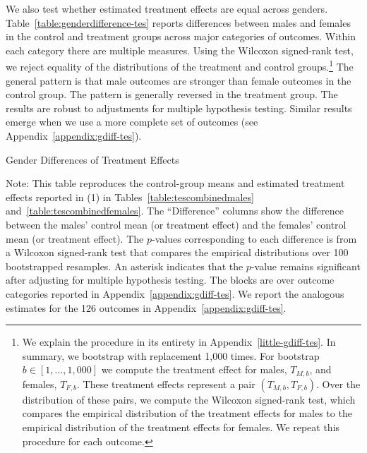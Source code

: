 We also test whether estimated treatment effects are equal across genders. Table~\ref{table:genderdifference-tes} reports differences between males and females in the control and treatment groups across major categories of outcomes. Within each category there are multiple measures. Using the Wilcoxon signed-rank test, we reject equality of the distributions of the treatment and control groups.\footnote{We explain the procedure in its entirety in Appendix~\ref{little-gdiff-tes}. In summary, we bootstrap with replacement 1,000 times. For bootstrap $b \in [1, \ldots, 1,000]$ we compute the treatment effect for males, $T_{M,b}$, and females, $T_{F,b}$. These treatment effects represent a pair $(T_{M,b}, T_{F,b})$. Over the distribution of these pairs, we compute the Wilcoxon signed-rank test, which compares the empirical distribution of the treatment effects for males to the empirical distribution of the treatment effects for females. We repeat this procedure for each outcome.} The general pattern is that male outcomes are stronger than female outcomes in the control group. The pattern is generally reversed in the treatment group. The results are robust to adjustments for multiple hypothesis testing. Similar results emerge when we use a more complete set of outcomes (see Appendix~\ref{appendix:gdiff-tes}).

\begin{table}
\centering
\begin{threeparttable}
\caption{Gender Differences of Treatment Effects}\label{table:genderdifference-tes}
\begin{scriptsize}

\end{scriptsize}
\begin{tablenotes}
\scriptsize
Note: This table reproduces the control-group means and estimated treatment effects reported in (1) in Tables~\ref{table:tescombinedmales} and~\ref{table:tescombinedfemales}. The ``Difference'' columns show the difference between the males' control mean (or treatment effect) and the females' control mean (or treatment effect). The $p$-values corresponding to each difference is from a Wilcoxon signed-rank test that compares the empirical distributions over 100 bootstrapped resamples. An asterisk indicates that the $p$-value remains significant after adjusting for multiple hypothesis testing. The blocks are over outcome categories reported in Appendix~\ref{appendix:gdiff-tes}. We report the analogous estimates for the 126 outcomes in Appendix~\ref{appendix:gdiff-tes}.
\end{tablenotes}
\end{threeparttable}
\end{table}

